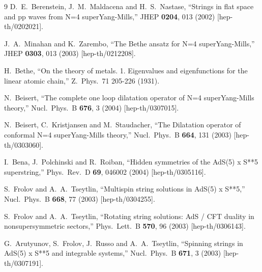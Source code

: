\documentclass[a4paper,11pt]{article}
\numberwithin{equation}{section}
\begin{document}
\begin{thebibliography} {9}
  D.~E.~Berenstein, J.~M.~Maldacena and H.~S.~Nastase,
  ``Strings in flat space and pp waves from N=4 superYang-Mills,''
  JHEP {\bf 0204}, 013 (2002)
  [hep-th/0202021].

  J.~A.~Minahan and K.~Zarembo,
  ``The Bethe ansatz for N=4 superYang-Mills,''
  JHEP {\bf 0303}, 013 (2003)
  [hep-th/0212208].

  H.~Bethe, 
  ``On the theory of metals. 1. Eigenvalues and eigenfunctions for the linear atomic chain,''
  Z.\ Phys.\ 71 205-226 (1931).

  N.~Beisert,
  ``The complete one loop dilatation operator of N=4 superYang-Mills theory,''
  Nucl.\ Phys.\ B {\bf 676}, 3 (2004)
  [hep-th/0307015].

  N.~Beisert, C.~Kristjansen and M.~Staudacher,
  ``The Dilatation operator of conformal N=4 superYang-Mills theory,''
  Nucl.\ Phys.\ B {\bf 664}, 131 (2003)
  [hep-th/0303060].

  I.~Bena, J.~Polchinski and R.~Roiban,
  ``Hidden symmetries of the AdS(5) x S**5 superstring,''
  Phys.\ Rev.\ D {\bf 69}, 046002 (2004)
  [hep-th/0305116].

  S.~Frolov and A.~A.~Tseytlin,
  ``Multispin string solutions in AdS(5) x S**5,''
  Nucl.\ Phys.\ B {\bf 668}, 77 (2003)
  [hep-th/0304255].

  S.~Frolov and A.~A.~Tseytlin,
  ``Rotating string solutions: AdS / CFT duality in nonsupersymmetric sectors,''
  Phys.\ Lett.\ B {\bf 570}, 96 (2003)
  [hep-th/0306143].

  G.~Arutyunov, S.~Frolov, J.~Russo and A.~A.~Tseytlin,
  ``Spinning strings in AdS(5) x S**5 and integrable systems,''
  Nucl.\ Phys.\ B {\bf 671}, 3 (2003)
  [hep-th/0307191].


\end{thebibliography}
\end{document}
